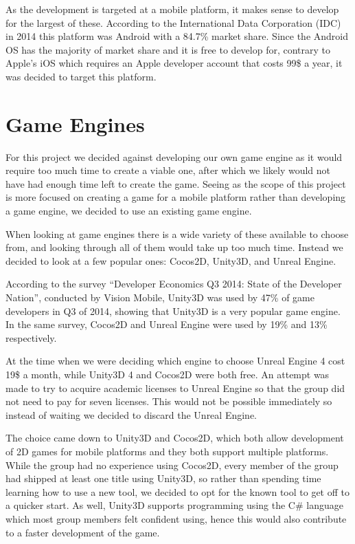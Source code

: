 As the development is targeted at a mobile platform, it makes sense to develop for the largest of these. 
According to the International Data Corporation (IDC) in 2014 this platform was Android with a 84.7\% market share\cite{marketshare}.
Since the Android OS has the majority of market share and it is free to develop for, contrary to Apple's iOS which requires an Apple developer account that costs 99\$ a year\cite{appledevprogram}, it was decided to target this platform.


\section{Game Engines}
For this project we decided against developing our own game engine as it would require too much time to create a viable one, after which we likely would not have had enough time left to create the game. 
Seeing as the scope of this project is more focused on creating a game for a mobile platform rather than developing a game engine, we decided to use an existing game engine.

When looking at game engines there is a wide variety of these available to choose from, and looking through all of them would take up too much time. 
Instead we decided to look at a few popular ones: Cocos2D, Unity3D, and Unreal Engine.

According to the survey ``Developer Economics Q3 2014: State of the Developer Nation''\cite{visionmobile-survey}, conducted by Vision Mobile\cite{visionmobile}, Unity3D was used by 47\% of game developers in Q3 of 2014, showing that Unity3D is a very popular game engine. 
In the same survey, Cocos2D and Unreal Engine were used by 19\% and 13\% respectively.

At the time when we were deciding which engine to choose Unreal Engine 4 cost 19\$ a month, while Unity3D 4 and Cocos2D were both free. 
An attempt was made to try to acquire academic licenses to Unreal Engine so that the group did not need to pay for seven licenses. 
This would not be possible immediately so instead of waiting we decided to discard the Unreal Engine.

The choice came down to Unity3D and Cocos2D, which both allow development of 2D games for mobile platforms and they both support multiple platforms. 
While the group had no experience using Cocos2D, every member of the group had shipped at least one title using Unity3D, so rather than spending time learning how to use a new tool, we decided to opt for the known tool to get off to a quicker start. 
As well, Unity3D supports programming using the C\# language which most group members felt confident using, hence this would also contribute to a faster development of the game.